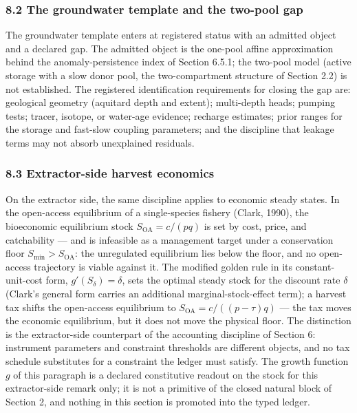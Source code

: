\documentclass[11pt]{article}
\begin{document}
\subsubsection{8.2 The groundwater template and the two-pool
gap}\label{the-groundwater-template-and-the-two-pool-gap}

The groundwater template enters at registered status with an admitted
object and a declared gap. The admitted object is the one-pool affine
approximation behind the anomaly-persistence index of Section 6.5.1; the
two-pool model (active storage with a slow donor pool, the
two-compartment structure of Section 2.2) is not established. The
registered identification requirements for closing the gap are:
geological geometry (aquitard depth and extent); multi-depth heads;
pumping tests; tracer, isotope, or water-age evidence; recharge
estimates; prior ranges for the storage and fast-slow coupling
parameters; and the discipline that leakage terms may not absorb
unexplained residuals.

\subsubsection{8.3 Extractor-side harvest
economics}\label{extractor-side-harvest-economics}

On the extractor side, the same discipline applies to economic steady
states. In the open-access equilibrium of a single-species fishery
(Clark, 1990), the bioeconomic equilibrium stock
\(S_{\mathrm{OA}} = c/(pq)\) is set by cost, price, and catchability ---
and is infeasible as a management target under a conservation floor
\(S_{\min} > S_{\mathrm{OA}}\): the unregulated equilibrium lies below
the floor, and no open-access trajectory is viable against it. The
modified golden rule in its constant-unit-cost form,
\(g'(S_\delta) = \delta\), sets the optimal steady stock for the
discount rate \(\delta\) (Clark's general form carries an additional
marginal-stock-effect term); a harvest tax shifts the open-access
equilibrium to \(S_{\mathrm{OA}} = c/((p - \tau)q)\) --- the tax moves
the economic equilibrium, but it does not move the physical floor. The
distinction is the extractor-side counterpart of the accounting
discipline of Section 6: instrument parameters and constraint thresholds
are different objects, and no tax schedule substitutes for a constraint
the ledger must satisfy. The growth function \(g\) of this paragraph is
a declared constitutive readout on the stock for this extractor-side
remark only; it is not a primitive of the closed natural block of
Section 2, and nothing in this section is promoted into the typed
ledger.
\end{document}
